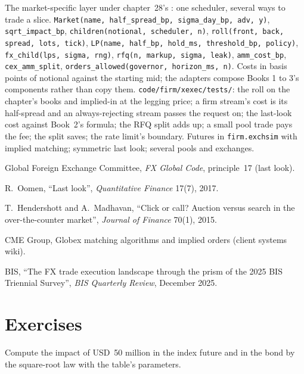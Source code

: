 \begin{build}
 The market-specific layer under chapter~28's : one scheduler, several ways to trade a slice.
 \texttt{Market(name, half\_spread\_bp, sigma\_day\_bp, adv, y)}, \texttt{sqrt\_impact\_bp}, \texttt{children(notional,
scheduler, n)}, \texttt{roll(front, back, spread, lots, tick)}, \texttt{LP(name, half\_bp, hold\_ms, threshold\_bp, policy)},
\texttt{fx\_child(lps, sigma, rng)}, \texttt{rfq(n, markup, sigma, leak)}, \texttt{amm\_cost\_bp}, \texttt{cex\_amm\_split}, \texttt{orders\_allowed(governor,
horizon\_ms, n)}.
 Costs in basis points of notional against the starting mid; the adapters compose Books 1 to 3's components rather than copy them.
 \texttt{code/firm/xexec/tests/}: the roll on the chapter's books and implied-in at the legging price; a firm stream's cost is
its half-spread and an always-rejecting stream passes the request on; the last-look cost against Book~2's formula; the RFQ split adds up; a small
pool trade pays the fee; the split saves; the rate limit's boundary.
 Futures in \texttt{firm.exchsim} with implied matching; symmetric last look; several pools and exchanges.
\end{build}

\begin{omsources}
\item Global Foreign Exchange Committee, \emph{FX Global Code}, principle~17 (last look).
\item R.~Oomen, ``Last look'', \emph{Quantitative Finance} 17(7), 2017.
\item T.~Hendershott and A.~Madhavan, ``Click or call? Auction versus search in the over-the-counter market'', \emph{Journal of Finance} 70(1),
2015.
\item CME Group, Globex matching algorithms and implied orders (client systems wiki).
\item BIS, ``The FX trade execution landscape through the prism of the 2025 BIS Triennial Survey'', \emph{BIS Quarterly Review}, December 2025.
\end{omsources}

\section{Exercises}

\begin{exercise}[$\star$]\label{exo:mx:execution-beyond-equities:1}
Compute the impact of USD~50 million in the index future and in the bond by the square-root law with the table's parameters.
\end{exercise}

